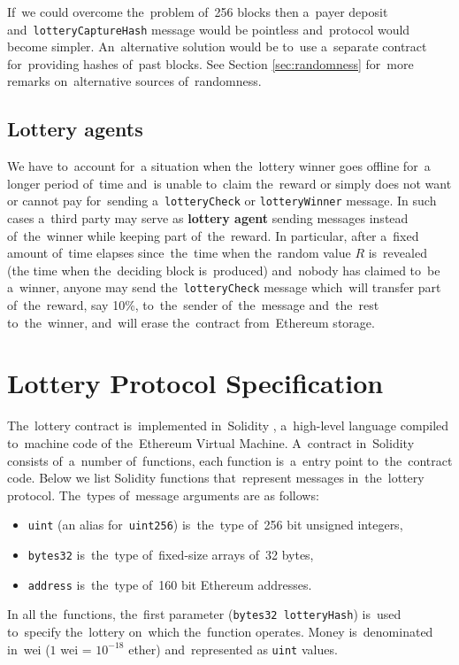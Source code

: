 \documentclass[a4paper]{article}
\begin{document}
    If~we could overcome the~problem of~256 blocks then a~payer deposit and~\texttt{lotteryCaptureHash} message would
    be pointless and~protocol would become simpler. An~alternative solution would be to~use a~separate contract
    for~providing hashes of~past blocks. See Section \ref{sec:randomness} for~more remarks on~alternative sources
    of~randomness.
\subsection{Lottery agents}
    We have to~account for~a situation when the~lottery winner goes offline for~a longer period of~time and~is
    unable to~claim the~reward or simply does not want or cannot pay for~sending a~\texttt{lotteryCheck} or
    \texttt{lotteryWinner} message. In such cases a~third party may serve as \textbf{lottery agent} sending messages
    instead of~the~winner while keeping part of~the~reward. In particular, after a~fixed amount of~time elapses
    since~the~time when the~random value $R$ is~revealed (the time when the~deciding block is~produced) and~nobody has
    claimed to~be a~winner, anyone may send the~\texttt{lotteryCheck} message which~will transfer part of~the~reward,
    say 10\%, to~the~sender of~the~message and~the~rest to~the~winner, and~will erase the~contract from~Ethereum
    storage.
\section{Lottery Protocol Specification}
\label{sec:lottery-protocol}
    The~lottery contract is~implemented in~Solidity \cite{SOLIDITY}, a~high-level language compiled to~machine code of
    the~Ethereum Virtual Machine\cite{ETHERDEV}. A~contract in~Solidity consists of~a~number of~functions, each
    function is~a~entry point to~the~contract code. Below we list Solidity functions that~represent messages
    in~the~lottery protocol. The~types of~message arguments are as follows:
    \begin{itemize}
        \item \texttt{uint} (an alias for~\texttt{uint256}) is~the~type of~256 bit unsigned integers,
        \item \texttt{bytes32} is~the~type of~fixed-size arrays of~32 bytes,
        \item \texttt{address} is~the~type of~160 bit Ethereum addresses.
    \end{itemize}
    In all the~functions, the~first parameter (\texttt{bytes32 lotteryHash}) is~used to~specify the~lottery on~which
    the~function operates. Money is~denominated in~wei ($1$ wei = $10^{-18}$ ether) and~represented as \texttt{uint} values.
\end{document}
